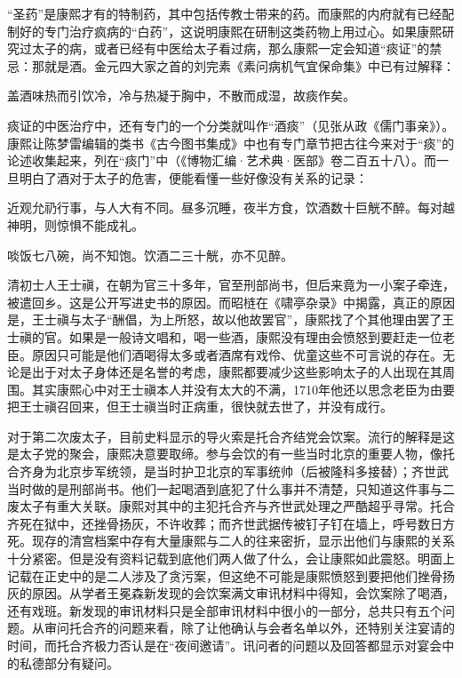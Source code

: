 
“圣药”是康熙才有的特制药，其中包括传教士带来的药。而康熙的内府就有已经配制好的专门治疗疯病的“白药”，这说明康熙在研制这类药物上用过心。如果康熙研究过太子的病，或者已经有中医给太子看过病，那么康熙一定会知道“痰证”的禁忌：那就是酒。金元四大家之首的刘完素《素问病机气宜保命集》中已有过解释：



\begin{bookquote}盖酒味热而引饮冷，冷与热凝于胸中，不散而成湿，故痰作矣。\end{bookquote}


痰证的中医治疗中，还有专门的一个分类就叫作“酒痰”（见张从政《儒门事亲》）。康熙让陈梦雷编辑的类书《古今图书集成》中也有专门章节把古往今来对于“痰”的论述收集起来，列在“痰门”中（《博物汇编·艺术典·医部》卷二百五十八）。而一旦明白了酒对于太子的危害，便能看懂一些好像没有关系的记录：



\begin{bookquote}近观允礽行事，与人大有不同。昼多沉睡，夜半方食，饮酒数十巨觥不醉。每对越神明，则惊惧不能成礼。\end{bookquote}


\begin{bookquote}啖饭七八碗，尚不知饱。饮酒二三十觥，亦不见醉。\end{bookquote}


清初士人王士禛，在朝为官三十多年，官至刑部尚书，但后来竟为一小案子牵连，被遣回乡。这是公开写进史书的原因。而昭梿在《啸亭杂录》中揭露，真正的原因是，王士禛与太子“酬倡，为上所怒，故以他故罢官”，康熙找了个其他理由罢了王士禛的官。如果是一般诗文唱和，喝一些酒，康熙没有理由会愤怒到要赶走一位老臣。原因只可能是他们酒喝得太多或者酒席有戏伶、优童这些不可言说的存在。无论是出于对太子身体还是名誉的考虑，康熙都要减少这些影响太子的人出现在其周围。其实康熙心中对王士禛本人并没有太大的不满，1710年他还以思念老臣为由要把王士禛召回来，但王士禛当时正病重，很快就去世了，并没有成行。



对于第二次废太子，目前史料显示的导火索是托合齐结党会饮案。流行的解释是这是太子党的聚会，康熙决意要取缔。参与会饮的有一些当时北京的重要人物，像托合齐身为北京步军统领，是当时护卫北京的军事统帅（后被隆科多接替）；齐世武当时做的是刑部尚书。他们一起喝酒到底犯了什么事并不清楚，只知道这件事与二废太子有重大关联。康熙对其中的主犯托合齐与齐世武处理之严酷超乎寻常。托合齐死在狱中，还挫骨扬灰，不许收葬；而齐世武据传被钉子钉在墙上，呼号数日方死。现存的清宫档案中存有大量康熙与二人的往来密折，显示出他们与康熙的关系十分紧密。但是没有资料记载到底他们两人做了什么，会让康熙如此震怒。明面上记载在正史中的是二人涉及了贪污案，但这绝不可能是康熙愤怒到要把他们挫骨扬灰的原因。从学者王冕森新发现的会饮案满文审讯材料中得知，会饮案除了喝酒，还有戏班。新发现的审讯材料只是全部审讯材料中很小的一部分，总共只有五个问题。从审问托合齐的问题来看，除了让他确认与会者名单以外，还特别关注宴请的时间，而托合齐极力否认是在“夜间邀请”。讯问者的问题以及回答都显示对宴会中的私德部分有疑问。


